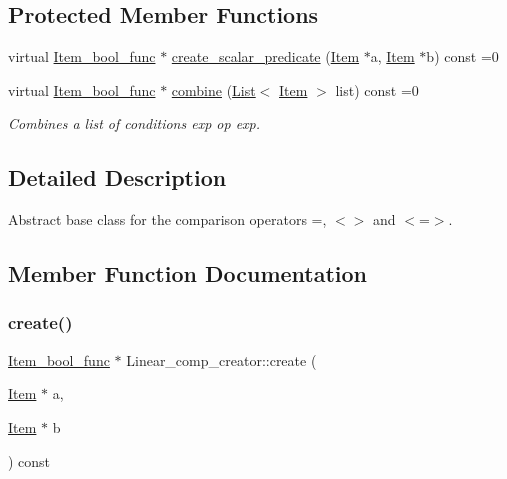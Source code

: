 \subsection*{Protected Member Functions}
\begin{DoxyCompactItemize}
\item 
virtual \mbox{\hyperlink{classItem__bool__func}{Item\+\_\+bool\+\_\+func}} $\ast$ \mbox{\hyperlink{classLinear__comp__creator_ad77c92f078a60d9026d394fa55d80a49}{create\+\_\+scalar\+\_\+predicate}} (\mbox{\hyperlink{classItem}{Item}} $\ast$a, \mbox{\hyperlink{classItem}{Item}} $\ast$b) const =0
\item 
\mbox{\label{classLinear__comp__creator_a66edcc06bc8ae10b62769b0656a3adf4}} 
virtual \mbox{\hyperlink{classItem__bool__func}{Item\+\_\+bool\+\_\+func}} $\ast$ \mbox{\hyperlink{classLinear__comp__creator_a66edcc06bc8ae10b62769b0656a3adf4}{combine}} (\mbox{\hyperlink{classList}{List}}$<$ \mbox{\hyperlink{classItem}{Item}} $>$ list) const =0
\begin{DoxyCompactList}\small\item\em Combines a list of conditions {\ttfamily exp op exp}. \end{DoxyCompactList}\end{DoxyCompactItemize}


\subsection{Detailed Description}
Abstract base class for the comparison operators =, $<$$>$ and $<$=$>$. 

\subsection{Member Function Documentation}
\mbox{\label{classLinear__comp__creator_abf8d17944a06f0f90a187f4d99e06319}} 
\subsubsection{\texorpdfstring{create()}{create()}}
{\footnotesize\ttfamily \mbox{\hyperlink{classItem__bool__func}{Item\+\_\+bool\+\_\+func}} $\ast$ Linear\+\_\+comp\+\_\+creator\+::create (\begin{DoxyParamCaption}\item[{\mbox{\hyperlink{classItem}{Item}} $\ast$}]{a,  }\item[{\mbox{\hyperlink{classItem}{Item}} $\ast$}]{b }\end{DoxyParamCaption}) const\hspace{0.3cm}{\ttfamily [virtual]}}


